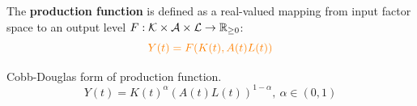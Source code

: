 \documentclass[11pt]{article}
\begin{document}
            \begin{definition}
                The \textbf{production function} is defined as a real-valued mapping from input factor space to an output level $F: \mathcal{{K}} \times \mathcal{{A}} \times \mathcal{{L}} \to \mathbb{R}_{\geq 0}$:
	            \begin{equation}
                    \textcolor{orange}{Y(t) = F(K(t), A(t)L(t))}
	            \end{equation}
            \end{definition}
            
            \begin{example}
            	    Cobb-Douglas form of production function.
                \begin{equation}
                    Y(t) = K(t)^\alpha (A(t)L(t))^{1 - \alpha},\ \alpha \in (0, 1)
                \end{equation}
            \end{example}
            
\end{document}
